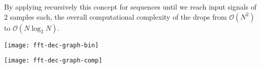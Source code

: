 	
	By applying recursively this concept for sequences until we reach input signals of 2 samples each, the overall computational complexity of the \dft  drops from $\mathcal O(N^2)$ to $\mathcal O(N\log_2N)$.
	\begin{SCfigure}[2][bht]
		\centering \texttt{[image: fft-dec-graph-bin]}
		\caption{graph representation of the \fft using the decimation in time algorithm computed on 2 points.} \label{fig:dft:ditsing}
	\end{SCfigure}
	

	\begin{SCfigure}[2][bht]
		\centering \texttt{[image: fft-dec-graph-comp]}
		\caption{complete graph representing the computation to do with the decimation in time algorithm for $N=8$ samples. The transform of 2 value is shown in figure \ref{fig:dft:ditsing}.}
	\end{SCfigure}
	
	
	
	
	
	
	
	
	
	
	
	
	
	
	
	
	
	
	
	
	
	
	
	
	
	
	
	
	
	
	
	
	
	
	
	
	
	
	
	
	
	